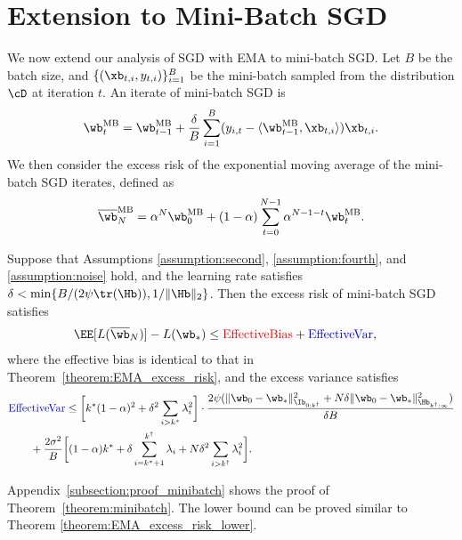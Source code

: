 \documentclass[11pt]{article}
\newcommand{\owb}{\overline{\wb}}
\begin{document}
\section{Extension to Mini-Batch SGD}

We now extend our analysis of SGD with EMA to mini-batch SGD. Let $B$ be the batch size, and $\{(\xb_{t, i}, y_{t, i})\}_{i=1}^B$ be the mini-batch sampled from the distribution $\cD$ at iteration $t$. An iterate of mini-batch SGD is
\begin{align*}
\wb_t^{\mathrm{MB}}=\wb_{t-1}^{\mathrm{MB}}+\frac{\delta}{B}\sum_{i=1}^B(y_{i, t}-\langle\wb_{t-1}^{\mathrm{MB}}, \xb_{t, i}\rangle)\xb_{t, i}.
\end{align*}
We then consider the excess risk of the exponential moving average of the mini-batch SGD iterates, defined as
\begin{align*}
\owb_N^{\mathrm{MB}}=\alpha^N\wb_0^{\mathrm{MB}}+(1-\alpha)\sum_{t=0}^{N-1}\alpha^{N-1-t}\wb_t^{\mathrm{MB}}.
\end{align*}

\begin{theorem}\label{theorem:minibatch}
Suppose that Assumptions \ref{assumption:second}, \ref{assumption:fourth}, and \ref{assumption:noise} hold, and the learning rate satisfies $\delta<\min\{B/(2\psi\tr(\Hb)), 1/\|\Hb\|_2\}$. Then the excess risk of mini-batch SGD satisfies
\begin{align*}
\EE[L(\owb_N)]-L(\wb_*)&\le\textcolor{red}{\mathrm{EffectiveBias}}+\textcolor{blue}{\mathrm{EffectiveVar}},
\end{align*}
where the effective bias is identical to that in Theorem~\ref{theorem:EMA_excess_risk}, and the excess variance satisfies
\begin{align*}
&\textcolor{blue}{\mathrm{EffectiveVar}}\le\bigg[k^*(1-\alpha)^2+\delta^2\sum_{i>k^*}\lambda_i^2\bigg]\cdot\frac{2\psi(\|\wb_0-\wb_*\|_{\Ib_{0:k^\dagger}}^2+N\delta\|\wb_0-\wb_*\|_{\Hb_{k^\dagger:\infty}}^2)}{\delta B}\\
&\qquad+\frac{2\sigma^2}{B}\bigg[(1-\alpha)k^*+\delta\sum_{i=k^*+1}^{k^\dagger}\lambda_i+N\delta^2\sum_{i>k^\dagger}\lambda_i^2\bigg].
\end{align*}
\end{theorem}
Appendix~\ref{subsection:proof_minibatch} shows the proof of Theorem~\ref{theorem:minibatch}.
The lower bound can be proved similar to Theorem \ref{theorem:EMA_excess_risk_lower}.
\end{document}
